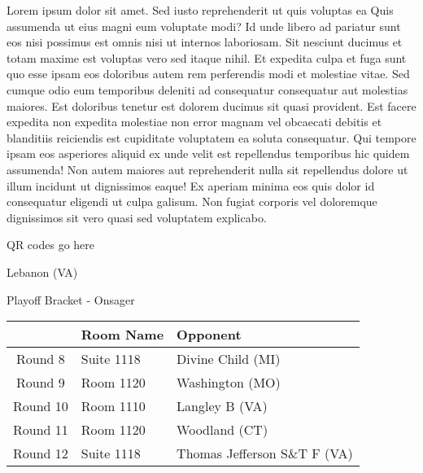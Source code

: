 \documentclass{article}%
\begin{document}
\vspace*{8pt}%
\linebreak%
\newline%
\newline%
Lorem ipsum dolor sit amet. Sed iusto reprehenderit ut quis voluptas ea Quis assumenda ut eius magni eum voluptate modi? Id unde libero ad pariatur sunt eos nisi possimus est omnis nisi ut internos laboriosam. Sit nesciunt ducimus et totam maxime est voluptas vero sed itaque nihil. Et expedita culpa et fuga sunt quo esse ipsam eos doloribus autem rem perferendis modi et molestiae vitae.\newline%
\newline%
Sed cumque odio eum temporibus deleniti ad consequatur consequatur aut molestias maiores. Est doloribus tenetur est dolorem ducimus sit quasi provident. Est facere expedita non expedita molestiae non error magnam vel obcaecati debitis et blanditiis reiciendis est cupiditate voluptatem ea soluta consequatur. Qui tempore ipsam eos asperiores aliquid ex unde velit est repellendus temporibus hic quidem assumenda!\newline%
\newline%
Non autem maiores aut reprehenderit nulla sit repellendus dolore ut illum incidunt ut dignissimos eaque! Ex aperiam minima eos quis dolor id consequatur eligendi ut culpa galisum. Non fugiat corporis vel doloremque dignissimos sit vero quasi sed voluptatem explicabo.\newline%
\newline%
%
\vspace*{30pt}%
\begin{center}%
\begin{Huge}%
QR codes go here%
\end{Huge}%
\end{center}%
\newpage%
\begin{center}%
\begin{Huge}%
Lebanon (VA)%
\end{Huge}%
\vspace*{8pt}%
\linebreak%
\begin{Large}%
Playoff Bracket {-} Onsager%
\end{Large}%
\end{center}%
%
\begin{tabularx}{\textwidth}{|c|Y|Y|}%
\hline%
&Room Name&Opponent\\%
\hline%
Round 8&Suite 1118&Divine Child (MI)\\%
Round 9&Room 1120&Washington (MO)\\%
Round 10&Room 1110&Langley B (VA)\\%
Round 11&Room 1120&Woodland (CT)\\%
Round 12&Suite 1118&Thomas Jefferson S\&T F (VA)\\%
\hline%
\end{tabularx}%
\end{document}
